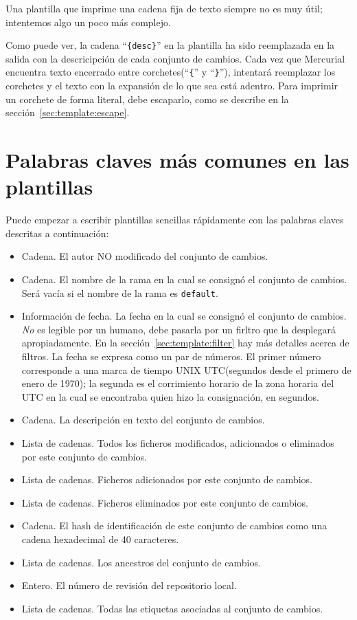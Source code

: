 Una plantilla que imprime una cadena fija de texto siempre no es muy
útil; intentemos algo un poco más complejo.


Como puede ver, la cadena ``\Verb+{desc}+'' en la plantilla ha sido
reemplazada en la salida con la descricipción de cada conjunto de
cambios.  Cada vez que Mercurial encuentra texto encerrado entre
corchetes(``\texttt{\{}'' y ``\texttt{\}}''), intentará reemplazar los
corchetes y el texto con la expansión de lo que sea está adentro.
Para imprimir un corchete de forma literal, debe escaparlo, como se
describe en la sección~\ref{sec:template:escape}.

\section{Palabras claves más comunes en las plantillas}
\label{sec:template:keyword}

Puede empezar a escribir plantillas sencillas rápidamente con las
palabras claves descritas a continuación:

\begin{itemize}
\item[\tplkword{author}] Cadena.  El autor NO modificado del conjunto
  de cambios.
\item[\tplkword{branches}] Cadena.  El nombre de la rama en la cual se
  consignó el conjunto de cambios.  Será vacía si el nombre de la rama es
  \texttt{default}.
\item[\tplkword{date}] Información de fecha.  La fecha en la cual se
  consignó el conjunto de cambios.  \emph{No} es legible por un
  humano, debe pasarla por un firltro que la desplegará
  apropiadamente.  En la sección~\ref{sec:template:filter} hay más
  detalles acerca de filtros.  La fecha se expresa como un par de
  números.  El primer número corresponde a una marca de tiempo UNIX
  UTC(segundos desde el primero de enero de 1970); la segunda es el
  corrimiento horario de la zona horaria del UTC en la cual se encontraba
  quien hizo la consignación, en segundos.
\item[\tplkword{desc}] Cadena.  La descripción en texto del conjunto
  de cambios.
\item[\tplkword{files}] Lista de cadenas.  Todos los ficheros
  modificados, adicionados o eliminados por este conjunto de cambios.
\item[\tplkword{file\_adds}] Lista de cadenas.  Ficheros adicionados
  por este conjunto de cambios.
\item[\tplkword{file\_dels}] Lista de cadenas.  Ficheros eliminados
  por este conjunto de cambios.
\item[\tplkword{node}] Cadena.  El hash de identificación de este
  conjunto de cambios como una cadena hexadecimal de 40 caracteres.
\item[\tplkword{parents}] Lista de cadenas.  Los ancestros del
  conjunto de cambios.
\item[\tplkword{rev}] Entero.  El número de revisión del repositorio
  local.
\item[\tplkword{tags}] Lista de cadenas.  Todas las etiquetas
  asociadas al conjunto de cambios.
\end{itemize}

